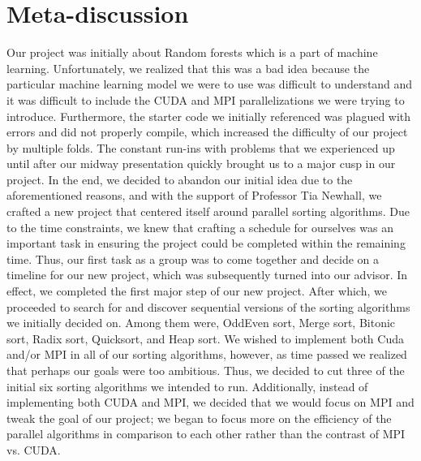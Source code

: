 \documentclass[11pt,twocolumn]{article}
\begin{document}
\section{Meta-discussion}\label{meta} 
Our project was initially about Random forests which is a part of machine learning. Unfortunately, we realized that this was a bad idea because the particular machine learning model we were to use was difficult to understand and it was difficult to include the CUDA and MPI parallelizations we were trying to introduce. Furthermore, the starter code we initially referenced was plagued with errors and did not properly compile, which increased the difficulty of our project by multiple folds. The constant run-ins with problems that we experienced up until after our midway presentation quickly brought us to a major cusp in our project. In the end, we decided to abandon our initial idea due to the aforementioned reasons, and with the support of Professor Tia Newhall, we crafted a new project that centered itself around parallel sorting algorithms.
Due to the time constraints, we knew that crafting a schedule for ourselves was an important task in ensuring the project could be completed within the remaining time. Thus, our first task as a group was to come together and decide on a timeline for our new project, which was subsequently turned into our advisor. In effect, we completed the first major step of our new project. After which, we proceeded to search for and discover sequential versions of the sorting algorithms we initially decided on. Among them were, OddEven sort, Merge sort, Bitonic sort, Radix sort, Quicksort, and Heap sort. We wished to implement both Cuda and/or MPI in all of our sorting algorithms, however, as time passed we realized that perhaps our goals were too ambitious. Thus, we decided to cut three of the initial six sorting algorithms we intended to run. Additionally, instead of implementing both CUDA and MPI, we decided that we would focus on MPI and tweak the goal of our project; we began to focus more on the efficiency of the parallel algorithms in comparison to each other rather than the contrast of MPI vs. CUDA. 
\end{document}

